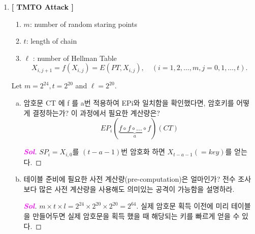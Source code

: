 \begin{enumerate}[\bf 1.]
\begin{enumerate}[(a)]
\begin{proof}[\textcolor{magenta}{\bf Sol}]
\begin{enumerate}
				\item 고정 평문에 대하여 $2^{k_1}$ 테이블을 사전계산한다.
				\item 암호문 수집 후 $2^{k_2}$ 정도의 복호화하면서 찾을 수 있다.
			\end{enumerate}
		\end{proof}
	\end{enumerate} %
\item \textbf{[ TMTO Attack ]}
\begin{enumerate}[(1)]
	\item $m$: number of random staring points
	\item $t$: length of chain
	\item $\ell$ : number of Hellman Table \[
	X_{i,j+1}=f(X_{i,j})=E(PT,X_{i,j}),\quad(i=1,2,\dots,m, j = 0,1,\dots,t).
	\]
\end{enumerate} Let $m=2^{24},t=2^{20}$ and $\ell=2^{20}$.
\begin{center}
\end{center}
\begin{enumerate}[(a)]
	\item 암호문 CT 에 f 를 a번 적용하여 EPi와 일치함을 확인했다면, 암호키를
	어떻게 결정하는가? 이 과정에서 필요한 계산량은?
	\[EP_i(\underbrace{f\circ f\circ\dots\circ f}_{a})(CT)\]
	\begin{proof}[\textcolor{magenta}{\bf Sol}]
	$SP_i=X_{i,0}$를 $(t-a-1)$번 암호화 하면 $X_{t-a-1}(=key)$를 얻는다.
	\end{proof}
	\item 테이블 준비에 필요한 사전 계산량(pre-computation)은 얼마인가? 전수
	조사보다 많은 사전 계산량을 사용해도 의미있는 공격이 가능함을 설명하라.
	\begin{proof}[\textcolor{magenta}{\bf Sol}]
	$m\times t\times l=2^{24}\times 2^{20}\times 2^{20}=2^{64}$. 실제 암호문 획득 이전에 미리 테이블을 만들어두면 실제 암호문을 획득 했을 때 해당되는 키를 빠르게 얻을 수 있다.

\end{proof}
\end{enumerate}
\end{enumerate}
